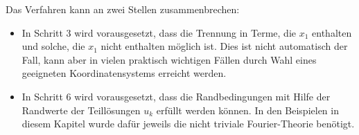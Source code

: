 Das Verfahren kann an zwei Stellen zusammenbrechen:
\begin{itemize}
\item In Schritt 3 wird vorausgesetzt, dass die Trennung in 
Terme, die $x_1$ enthalten  und solche, die $x_1$ nicht enthalten
möglich ist. Dies ist nicht automatisch der Fall, kann aber in
vielen praktisch wichtigen Fällen durch Wahl eines geeigneten
Koordinatensystems erreicht werden.
\item In Schritt 6 wird vorausgesetzt, dass die Randbedingungen
mit Hilfe der Randwerte der Teillösungen $u_k$ erfüllt werden
können. In den Beispielen in diesem Kapitel wurde dafür jeweils
die nicht triviale Fourier-Theorie benötigt. 
\end{itemize}

